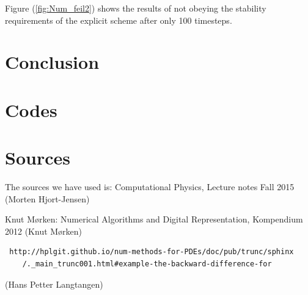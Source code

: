 \documentclass[a4paper,10pt]{article}
\begin{document}
Figure (\ref{fig:Num_feil2}) shows the results of not obeying the stability requirements of the explicit scheme after only 100 timesteps.
\section{Conclusion}

\section{Codes}

\section{Sources}
The sources we have used is:
Computational Physics, Lecture notes Fall 2015 (Morten Hjort-Jensen)

Knut Mørken: Numerical Algorithms and Digital Representation, Kompendium 2012 (Knut Mørken)

\begin{verbatim}
 http://hplgit.github.io/num-methods-for-PDEs/doc/pub/trunc/sphinx
	/._main_trunc001.html#example-the-backward-difference-for  
\end{verbatim}
    (Hans Petter Langtangen)
\end{document}
